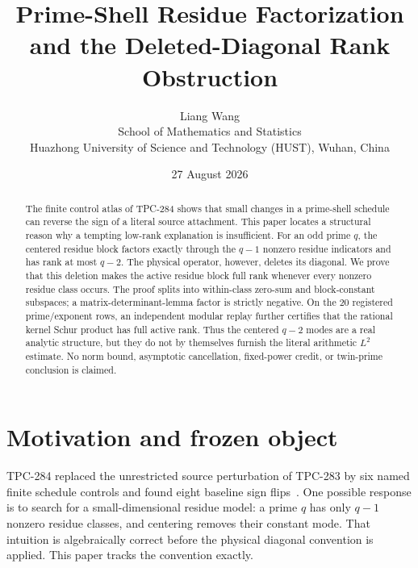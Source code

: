 \documentclass[11pt]{article}
\title{Prime-Shell Residue Factorization and the Deleted-Diagonal Rank Obstruction}
\author{Liang Wang\\
School of Mathematics and Statistics\\
Huazhong University of Science and Technology (HUST), Wuhan, China}
\date{27 August 2026}
\begin{document}
\maketitle

\begin{abstract}
The finite control atlas of TPC-284 shows that small changes in a prime-shell
schedule can reverse the sign of a literal source attachment.  This paper
locates a structural reason why a tempting low-rank explanation is
insufficient.  For an odd prime $q$, the centered residue block factors
exactly through the $q-1$ nonzero residue indicators and has rank at most
$q-2$.  The physical operator, however, deletes its diagonal.  We prove that
this deletion makes the active residue block full rank whenever every nonzero
residue class occurs.  The proof splits into within-class zero-sum and
block-constant subspaces; a matrix-determinant-lemma factor is strictly
negative.  On the 20 registered prime/exponent rows, an independent modular
replay further certifies that the rational kernel Schur product has full active
rank.  Thus the centered $q-2$ modes are a real analytic structure, but they
do not by themselves furnish the literal arithmetic $L^2$ estimate.  No norm
bound, asymptotic cancellation, fixed-power credit, or twin-prime conclusion
is claimed.
\end{abstract}

\section{Motivation and frozen object}

TPC-284 replaced the unrestricted source perturbation of TPC-283 by six named
finite schedule controls and found eight baseline sign flips~\cite{tpc284}.
One possible response is to search for a small-dimensional residue model: a
prime $q$ has only $q-1$ nonzero residue classes, and centering removes their
constant mode.  That intuition is algebraically correct before the physical
diagonal convention is applied.  This paper tracks the convention exactly.
\end{document}
